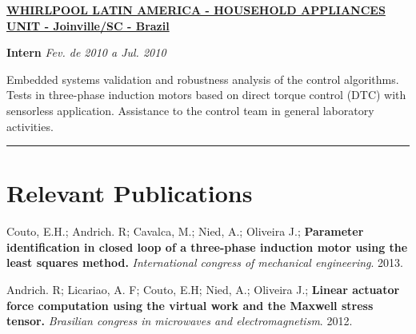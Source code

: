 \documentclass[10pt]{article}
\begin{document}
\blankline

\href{http://www.whirlpool.com.br/}{\textbf{WHIRLPOOL LATIN AMERICA - HOUSEHOLD APPLIANCES UNIT - Joinville/SC - Brazil}}

\begin{outerlist}

\item[] \textbf{Intern}%
    \hfill \textit{Fev. de 2010 a Jul. 2010}
    \begin{innerlist}
        \item Embedded systems validation and robustness analysis of the control algorithms. Tests in three-phase induction motors based on direct torque control (DTC) with sensorless application. Assistance to the control team in general laboratory activities.
    \end{innerlist}    
\end{outerlist}

\blankline
\hrule

\section{Relevant Publications} 
\begin{bibsection}
		\item Couto, E.H.; Andrich. R; Cavalca, M.; Nied, A.; Oliveira J.; \textbf{Parameter identification in closed loop of a three-phase induction motor using the least squares method.} \textit{International congress of mechanical engineering}. 2013.
        \item Andrich. R; Licariao, A. F; Couto, E.H; Nied, A.; Oliveira J.; \textbf{Linear actuator force computation using the  virtual work and the Maxwell stress tensor.} \textit{Brasilian congress in microwaves and electromagnetism}. 2012.
\end{bibsection}
\end{document}
